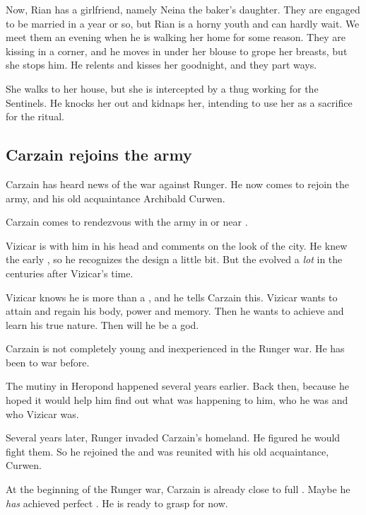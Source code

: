 \begin{garbage}
Now, Rian has a girlfriend, namely Neina the baker's daughter. They are engaged to be married in a year or so, but Rian is a horny youth and can hardly wait. We meet them an evening when he is walking her home for some reason. They are kissing in a corner, and he moves in under her blouse to grope her breasts, but she stops him. He relents and kisses her goodnight, and they part ways. 

She walks to her house, but she is intercepted by a thug working for the Sentinels. He knocks her out and kidnaps her, intending to use her as a sacrifice for the \Nithdornazsh{} ritual. 







\subsection{Carzain rejoins the army}
Carzain \Shireyo{} has heard news of the war against Runger. 
He now comes to rejoin the army, and his old acquaintance Archibald Curwen. 

Carzain comes to rendezvous with the army in or near \Forklin. 

Vizicar is with him in his head and comments on the look of the city. 
He knew the early \Ortaicans{}, so he recognizes the design a little bit. 
But the \Ortaicans{} evolved a \emph{lot} in the centuries after Vizicar's time. 

Vizicar knows he is more than a \human, and he tells Carzain this. 
Vizicar wants to attain \kenosis{} and regain his body, power and memory. 
Then he wants to achieve \apotheosis{} and learn his true nature.
Then will he be a god. 

Carzain is not completely young and inexperienced in the Runger war. 
He has been to war before. 

The mutiny in Heropond happened several years earlier. 
Back then,  because he hoped it would help him find out what was happening to him, who he was and who Vizicar was. 

Several years later, Runger invaded Carzain's homeland. 
He figured he would fight them. 
So he rejoined the \ishrah{} and was reunited with his old acquaintance, Curwen. 

At the beginning of the Runger war, Carzain is already close to full \kenosis. 
Maybe he \emph{has} achieved perfect \kenosis. 
He is ready to grasp for \apotheosis{} now.


\end{garbage}
